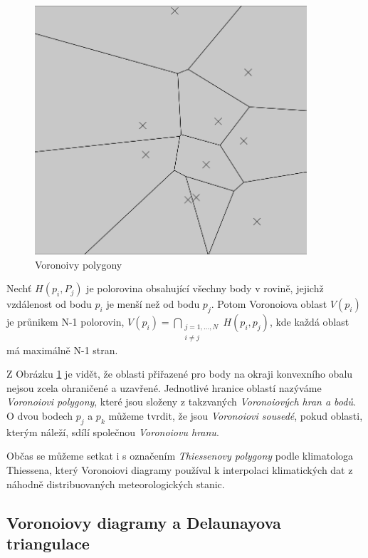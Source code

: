 \documentclass[12pt,a4paper]{article}
\begin{document}
\begin{figure}[h!]
\centering
\includegraphics[width=0.9\textwidth]{../img/vor_pol.png}
\caption{Voronoivy polygony}
\label{fig:vor_pol}
\end{figure}

Nechť $H(p_i,P_j)$ je polorovina obsahující všechny body v rovině, jejichž vzdálenost od bodu $p_i$ je menší než od bodu $p_j$. Potom Voronoiova oblast $V(p_i)$ je průnikem N-1 polorovin,
$V(p_i)= \bigcap\limits_{\substack{j=1,...,N \\ i\not=j}}H(p_i,p_j)$, kde každá oblast má maximálně N-1 stran.

Z Obrázku \ref{fig:vor_pol} je vidět, že oblasti přiřazené pro body na okraji konvexního obalu nejsou zcela ohraničené a uzavřené. Jednotlivé hranice oblastí nazýváme \textit{Voronoiovi polygony}, které jsou složeny z takzvaných \textit{Voronoiových hran a bodů}. O dvou bodech $p_j$ a $p_k$ můžeme tvrdit, že jsou \textit{Voronoiovi sousedé}, pokud oblasti, kterým náleží, sdílí společnou \textit{Voronoiovu hranu}. 

Občas se můžeme setkat i s označením \textit{Thiessenovy polygony} podle klimatologa Thiessena, který Voronoiovi diagramy používal k interpolaci klimatických dat z náhodně distribuovaných meteorologických stanic.

\newpage
\subsection{Voronoiovy diagramy a Delaunayova triangulace}
\end{document}
